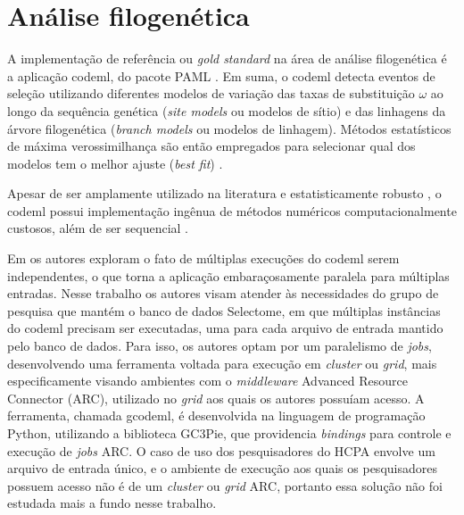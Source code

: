 \documentclass[cic,tc]{iiufrgs}
\begin{document}
\section{Análise filogenética}
\label{sec:filoant}

A implementação de referência ou \textit{gold standard} na área de análise
filogenética é a aplicação codeml, do pacote PAML \cite{valle2014optimization}.
Em suma, o codeml detecta eventos de seleção utilizando diferentes modelos de
variação das taxas de substituição $\omega$ ao longo da sequência genética
(\textit{site models} ou modelos de sítio) e das linhagens da árvore
filogenética (\textit{branch models} ou modelos de linhagem). Métodos
estatísticos de máxima verossimilhança são então empregados para selecionar
qual dos modelos tem o melhor ajuste (\textit{best fit}) \cite{yang2007paml}.

Apesar de ser amplamente utilizado na literatura e estatisticamente robusto
\cite{maldonado2016lmap}, o codeml possui implementação ingênua de métodos
numéricos computacionalmente custosos, além de ser sequencial
\cite{yang2020paml}. 

Em \cite{moretti2012gcodeml} os autores exploram o fato de múltiplas execuções
do codeml serem independentes, o que torna a aplicação embaraçosamente
paralela para múltiplas entradas. Nesse trabalho os autores visam atender às
necessidades do grupo de pesquisa que mantém o banco de dados Selectome, em
que múltiplas instâncias do codeml precisam ser executadas, uma para cada
arquivo de entrada mantido pelo banco de dados. Para isso, os autores optam
por um paralelismo de \textit{jobs}, desenvolvendo uma ferramenta voltada
para execução em \textit{cluster} ou \textit{grid}, mais especificamente
visando ambientes com o \textit{middleware} Advanced Resource Connector (ARC),
utilizado no \textit{grid} aos quais os autores possuíam acesso. A ferramenta,
chamada gcodeml, é desenvolvida na linguagem de programação Python, utilizando
a biblioteca GC3Pie, que providencia \textit{bindings} para controle e execução
de \textit{jobs} ARC. O caso de uso dos pesquisadores do HCPA envolve um
arquivo de entrada único, e o ambiente de execução aos quais os pesquisadores
possuem acesso não é de um \textit{cluster} ou \textit{grid} ARC, portanto essa
solução não foi estudada mais a fundo nesse trabalho.
\end{document}
